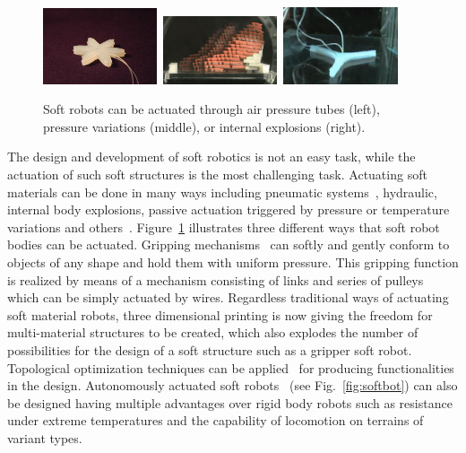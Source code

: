 \begin{figure}[t!]
\centering
\includegraphics[width=0.3\textwidth,height=0.13\textheight]{../Figures/Misc/soft_robotics_figure.png}\		
\includegraphics[width=0.3\textwidth,height=0.13\textheight]{../Figures/Misc/hillerPressureChamber.png}\	
\includegraphics[width=0.3\textwidth,height=0.13\textheight]{../Figures/Misc/ExplodingRobot.jpg}\\
\caption{Soft robots can be actuated through air pressure tubes (left), pressure variations (middle), or internal explosions (right).}
\label{fig:softRobotsActuation}
\end{figure}

The design and development of soft robotics is not an easy task, while the actuation of such soft structures is the most challenging task. Actuating soft materials can be done in many ways including pneumatic systems~\citep{ilievski2011soft, shepherd2011multigait}, hydraulic, internal body explosions, passive actuation triggered by pressure or temperature variations and others~\citep{laschi2012soft, seok2010peristaltic}. Figure~\ref{fig:softRobotsActuation} illustrates three different ways that soft robot bodies can be actuated. Gripping mechanisms~\citep{hirose1978development} can softly and gently conform to objects of any shape and hold them with uniform pressure. This gripping function is realized by means of a mechanism consisting of links and series of pulleys which can be simply actuated by wires. Regardless traditional ways of actuating soft material robots, three dimensional printing is now giving the freedom for multi-material structures to be created, which also explodes the number of possibilities for the design of a soft structure such as a gripper soft robot. Topological optimization techniques can be applied~\citep{hiller2009multi} for producing functionalities in the design. Autonomously actuated soft robots~\citep{tolleyresilient} (see Fig.~\ref{fig:softbot}) can also be designed having multiple advantages over rigid body robots such as resistance under extreme temperatures and the capability of locomotion on terrains of variant types. 

